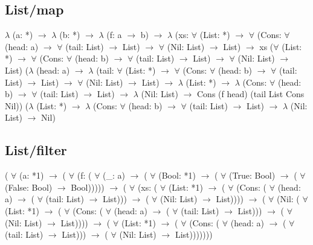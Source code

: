 \subsection*{List/map}
{\selectfont
\vspace{0.5cm}
$\lambda$ (a: *) $\rightarrow$ $\lambda$ (b: *) $\rightarrow$ $\lambda$ (f: a $\rightarrow$ b) $\rightarrow$ $\lambda$ (xs: $\forall$ (List: *)
$\rightarrow$ $\forall$ (Cons: $\forall$ (head: a) $\rightarrow$ $\forall$ (tail: List) $\rightarrow$ List) $\rightarrow$ $\forall$ (Nil: List) $\rightarrow$ List)
$\rightarrow$ xs ($\forall$ (List: *) $\rightarrow$ $\forall$ (Cons: $\forall$ (head: b) $\rightarrow$ $\forall$ (tail: List) $\rightarrow$ List)
$\rightarrow$ $\forall$ (Nil: List) $\rightarrow$ List) ($\lambda$ (head: a) $\rightarrow$ $\lambda$ (tail: $\forall$ (List: *) $\rightarrow$
$\forall$ (Cons: $\forall$ (head: b) $\rightarrow$ $\forall$ (tail: List) $\rightarrow$ List) $\rightarrow$ $\forall$ (Nil: List)
$\rightarrow$ List) $\rightarrow$ $\lambda$ (List: *) $\rightarrow$ $\lambda$ (Cons: $\forall$ (head: b) $\rightarrow$ $\forall$
(tail: List) $\rightarrow$ List) $\rightarrow$ $\lambda$ (Nil: List) $\rightarrow$ Cons (f head) (tail List Cons Nil))
($\lambda$ (List: *) $\rightarrow$ $\lambda$ (Cons: $\forall$ (head: b) $\rightarrow$ $\forall$ (tail: List) $\rightarrow$
List) $\rightarrow$ $\lambda$ (Nil: List) $\rightarrow$ Nil)
}

\subsection*{List/filter}
{\selectfont
\vspace{0.5cm}
( $\forall$ (a: *1)
$\rightarrow$ ( $\forall$ (f: ( $\forall$ (_: a)
  $\rightarrow$ ( $\forall$ (Bool: *1)
  $\rightarrow$ ( $\forall$ (True: Bool)
  $\rightarrow$ ( $\forall$ (False: Bool)
  $\rightarrow$ Bool)))))
$\rightarrow$ ( $\forall$ (xs: ( $\forall$ (List: *1)
  $\rightarrow$ ( $\forall$ (Cons: ( $\forall$ (head: a)
    $\rightarrow$ ( $\forall$ (tail: List)
    $\rightarrow$ List)))
  $\rightarrow$ ( $\forall$ (Nil: List)
  $\rightarrow$ List))))
$\rightarrow$ ( $\forall$ (Nil: ( $\forall$ (List: *1)
  $\rightarrow$ ( $\forall$ (Cons: ( $\forall$ (head: a)
    $\rightarrow$ ( $\forall$ (tail: List)
    $\rightarrow$ List)))
  $\rightarrow$ ( $\forall$ (Nil: List)
  $\rightarrow$ List))))
$\rightarrow$ ( $\forall$ (List: *1)
$\rightarrow$ ( $\forall$ (Cons: ( $\forall$ (head: a)
  $\rightarrow$ ( $\forall$ (tail: List)
  $\rightarrow$ List)))
$\rightarrow$ ( $\forall$ (Nil: List)
$\rightarrow$ List)))))))
}

